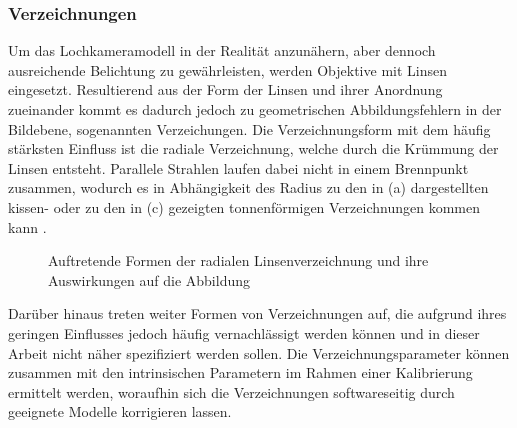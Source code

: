 \subsubsection{Verzeichnungen}
Um das Lochkameramodell in der Realität anzunähern, aber dennoch ausreichende Belichtung zu gewährleisten, werden Objektive mit Linsen eingesetzt. Resultierend aus der Form der Linsen und ihrer Anordnung zueinander kommt es dadurch jedoch zu geometrischen Abbildungsfehlern in der Bildebene, sogenannten Verzeichungen. Die Verzeichnungsform mit dem häufig stärksten Einfluss ist die radiale Verzeichnung, welche durch die Krümmung der Linsen entsteht. Parallele Strahlen laufen dabei nicht in einem Brennpunkt zusammen, wodurch es in Abhängigkeit des Radius zu den in  (a) dargestellten kissen- oder zu den in  (c) gezeigten tonnenförmigen Verzeichnungen kommen kann \cite{Hertzberg2012}.

\prever{
} 

\begin{figure}[!ht]
	\begin{center}
	\hspace{4mm}
	\hspace{4mm}
	\caption{Auftretende Formen der radialen Linsenverzeichnung und ihre Auswirkungen auf die Abbildung}
	\label{fig.distortions}
	\end{center}
\end{figure}


Darüber hinaus treten weiter Formen von Verzeichnungen auf, die aufgrund ihres geringen Einflusses jedoch häufig vernachlässigt werden können und in dieser Arbeit nicht näher spezifiziert werden sollen. Die Verzeichnungsparameter können zusammen mit den intrinsischen Parametern im Rahmen einer Kalibrierung ermittelt werden, woraufhin sich die Verzeichnungen softwareseitig durch geeignete Modelle korrigieren lassen. 

